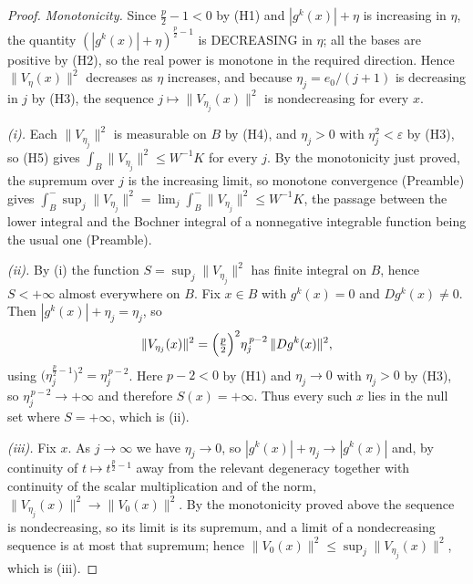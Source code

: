 \begin{proof}
\emph{Monotonicity.}  Since $\frac p2-1<0$ by (H1) and $|g^k(x)|+\eta$ is
increasing in $\eta$, the quantity $(|g^k(x)|+\eta)^{\frac p2-1}$ is
DECREASING in $\eta$; all the bases are positive by (H2), so the real power is
monotone in the required direction.  Hence $\|V_\eta(x)\|^2$ decreases as
$\eta$ increases, and because $\eta_j=e_0/(j+1)$ is decreasing in $j$ by (H3),
the sequence $j\mapsto\|V_{\eta_j}(x)\|^2$ is nondecreasing for every $x$.

\emph{(i).}  Each $\|V_{\eta_j}\|^2$ is measurable on $B$ by (H4), and
$\eta_j>0$ with $\eta_j^2<\varepsilon$ by (H3), so (H5) gives
$\int_B\|V_{\eta_j}\|^2\le W^{-1}K$ for every $j$.  By the monotonicity just
proved, the supremum over $j$ is the increasing limit, so monotone convergence
(Preamble) gives
$\int^-_B\sup_j\|V_{\eta_j}\|^2=\lim_j\int^-_B\|V_{\eta_j}\|^2\le W^{-1}K$,
the passage between the lower integral and the Bochner integral of a
nonnegative integrable function being the usual one (Preamble).

\emph{(ii).}  By (i) the function $S=\sup_j\|V_{\eta_j}\|^2$ has finite
integral on $B$, hence $S<+\infty$ almost everywhere on $B$.  Fix $x\in B$ with
$g^k(x)=0$ and $Dg^k(x)\neq0$.  Then $|g^k(x)|+\eta_j=\eta_j$, so
\[
\|V_{\eta_j}(x)\|^2=\Bigl(\tfrac p2\Bigr)^2\eta_j^{\,p-2}\,\|Dg^k(x)\|^2 ,
\]
using $\bigl(\eta_j^{\frac p2-1}\bigr)^2=\eta_j^{\,p-2}$.  Here $p-2<0$ by
(H1) and $\eta_j\to0$ with $\eta_j>0$ by (H3), so
$\eta_j^{\,p-2}\to+\infty$ and therefore $S(x)=+\infty$.  Thus every such $x$
lies in the null set where $S=+\infty$, which is (ii).

\emph{(iii).}  Fix $x$.  As $j\to\infty$ we have $\eta_j\to0$, so
$|g^k(x)|+\eta_j\to|g^k(x)|$ and, by continuity of $t\mapsto t^{\frac p2-1}$
away from the relevant degeneracy together with continuity of the scalar
multiplication and of the norm, $\|V_{\eta_j}(x)\|^2\to\|V_0(x)\|^2$.  By the
monotonicity proved above the sequence is nondecreasing, so its limit is its
supremum, and a limit of a nondecreasing sequence is at most that supremum;
hence $\|V_0(x)\|^2\le\sup_j\|V_{\eta_j}(x)\|^2$, which is (iii).
\end{proof}
